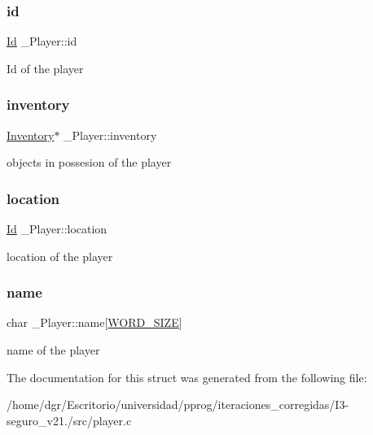 \subsubsection{\texorpdfstring{id}{id}}
{\footnotesize\ttfamily \hyperlink{types_8h_a845e604fb28f7e3d97549da3448149d3}{Id} \+\_\+\+Player\+::id}

Id of the player \mbox{\label{struct__Player_a5e02924cb82ca61f74ba414d190aa29b}} 
\subsubsection{\texorpdfstring{inventory}{inventory}}
{\footnotesize\ttfamily \hyperlink{inventory_8h_a2253bf64ac4ce6a9c1d6f39c0b0d32a3}{Inventory}$\ast$ \+\_\+\+Player\+::inventory}

objects in possesion of the player \mbox{\label{struct__Player_adbb6195d15b88f3f658e74274eff52d8}} 
\subsubsection{\texorpdfstring{location}{location}}
{\footnotesize\ttfamily \hyperlink{types_8h_a845e604fb28f7e3d97549da3448149d3}{Id} \+\_\+\+Player\+::location}

location of the player \mbox{\label{struct__Player_adda99df91c28eb58d392f2b43fc6898f}} 
\subsubsection{\texorpdfstring{name}{name}}
{\footnotesize\ttfamily char \+\_\+\+Player\+::name\mbox{[}\hyperlink{types_8h_a92ed8507d1cd2331ad09275c5c4c1c89}{W\+O\+R\+D\+\_\+\+S\+I\+ZE}\mbox{]}}

name of the player 

The documentation for this struct was generated from the following file\+:\begin{DoxyCompactItemize}
\item 
/home/dgr/\+Escritorio/universidad/pprog/iteraciones\+\_\+corregidas/\+I3-\/seguro\+\_\+v21./src/player.\+c\end{DoxyCompactItemize}
